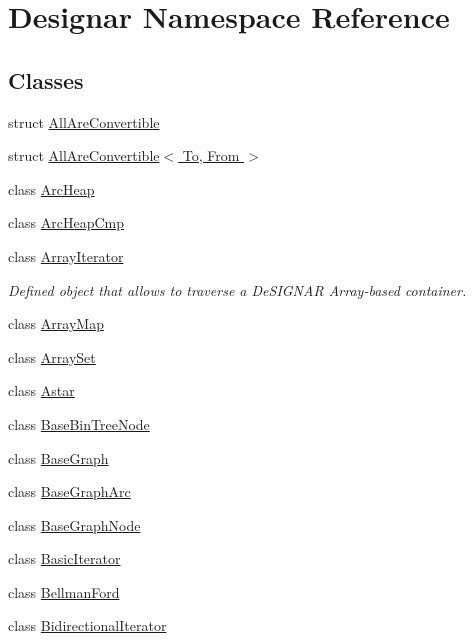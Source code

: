 \hypertarget{namespace_designar}{}\section{Designar Namespace Reference}
\label{namespace_designar}
\subsection*{Classes}
\begin{DoxyCompactItemize}
\item 
struct \hyperlink{struct_designar_1_1_all_are_convertible}{All\+Are\+Convertible}
\item 
struct \hyperlink{struct_designar_1_1_all_are_convertible_3_01_to_00_01_from_01_4}{All\+Are\+Convertible$<$ To, From $>$}
\item 
class \hyperlink{class_designar_1_1_arc_heap}{Arc\+Heap}
\item 
class \hyperlink{class_designar_1_1_arc_heap_cmp}{Arc\+Heap\+Cmp}
\item 
class \hyperlink{class_designar_1_1_array_iterator}{Array\+Iterator}
\begin{DoxyCompactList}\small\item\em Defined object that allows to traverse a De\+S\+I\+G\+N\+AR Array-\/based container. \end{DoxyCompactList}\item 
class \hyperlink{class_designar_1_1_array_map}{Array\+Map}
\item 
class \hyperlink{class_designar_1_1_array_set}{Array\+Set}
\item 
class \hyperlink{class_designar_1_1_astar}{Astar}
\item 
class \hyperlink{class_designar_1_1_base_bin_tree_node}{Base\+Bin\+Tree\+Node}
\item 
class \hyperlink{class_designar_1_1_base_graph}{Base\+Graph}
\item 
class \hyperlink{class_designar_1_1_base_graph_arc}{Base\+Graph\+Arc}
\item 
class \hyperlink{class_designar_1_1_base_graph_node}{Base\+Graph\+Node}
\item 
class \hyperlink{class_designar_1_1_basic_iterator}{Basic\+Iterator}
\item 
class \hyperlink{class_designar_1_1_bellman_ford}{Bellman\+Ford}
\item 
class \hyperlink{class_designar_1_1_bidirectional_iterator}{Bidirectional\+Iterator}
\item 

\end{DoxyCompactItemize}
